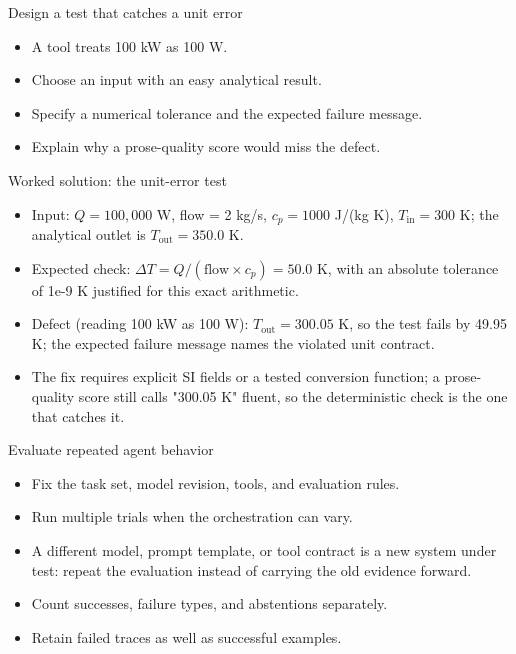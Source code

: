 \documentclass[aspectratio=169,11pt]{beamer}
\begin{document}
\begin{frame}[t,fragile]{Design a test that catches a unit error}
\fontsize{11.5}{14}\selectfont
\begin{itemize}\setlength{\itemsep}{2mm}
\item A tool treats 100 kW as 100 W.
\item Choose an input with an easy analytical result.
\item Specify a numerical tolerance and the expected failure message.
\item Explain why a prose-quality score would miss the defect.
\end{itemize}
\end{frame}
\begin{frame}[t,fragile]{Worked solution: the unit-error test}
\fontsize{11.5}{14}\selectfont
\begin{itemize}\setlength{\itemsep}{2mm}
\item Input: $Q = 100{,}000$ W, flow = 2 kg/s, $c_p = 1000$ J/(kg K), $T_{\mathrm{in}} = 300$ K; the analytical outlet is $T_{\mathrm{out}} = 350.0$ K.
\item Expected check: $\Delta T = Q/(\text{flow}\times c_p) = 50.0$ K, with an absolute tolerance of 1e-9 K justified for this exact arithmetic.
\item Defect (reading 100 kW as 100 W): $T_{\mathrm{out}} = 300.05$ K, so the test fails by 49.95 K; the expected failure message names the violated unit contract.
\item The fix requires explicit SI fields or a tested conversion function; a prose-quality score still calls "300.05 K" fluent, so the deterministic check is the one that catches it.
\end{itemize}
\end{frame}
\begin{frame}[t,fragile]{Evaluate repeated agent behavior}
\fontsize{11.5}{14}\selectfont
\begin{itemize}\setlength{\itemsep}{2mm}
\item Fix the task set, model revision, tools, and evaluation rules.
\item Run multiple trials when the orchestration can vary.
\item A different model, prompt template, or tool contract is a new system under test: repeat the evaluation instead of carrying the old evidence forward.
\item Count successes, failure types, and abstentions separately.
\item Retain failed traces as well as successful examples.
\end{itemize}
\end{frame}
\end{document}
